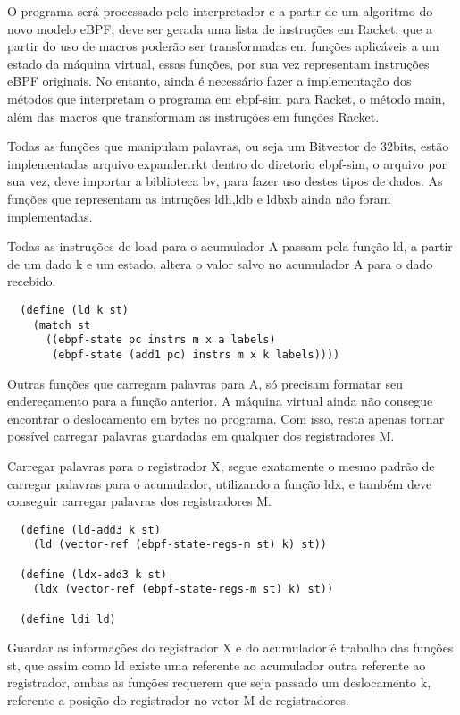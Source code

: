 \documentclass[paper=a4, fontsize=12pt]{article}
\theoremstyle{definition}
\begin{document}
O programa será processado pelo interpretador e a partir de um algoritmo do novo
modelo eBPF, deve ser gerada uma lista de instruções em Racket, que a partir do uso de macros
poderão ser transformadas em funções aplicáveis a um estado da máquina virtual, essas funções,
por sua vez representam instruções eBPF originais. No entanto, ainda é necessário fazer a implementação
dos métodos  que interpretam o programa em ebpf-sim para Racket, o método main, além das macros
que transformam as instruções em funções Racket. 

Todas as funções que manipulam palavras, ou seja um Bitvector de 32bits, estão implementadas
arquivo expander.rkt dentro do diretorio ebpf-sim, o arquivo por sua vez, deve importar a biblioteca 
bv, para fazer uso destes tipos de dados. As funções que representam as intruções ldh,ldb e ldbxb
ainda não foram implementadas.

Todas as instruções de load para o acumulador A passam pela função ld, a partir de um dado k e um
estado, altera o valor salvo no acumulador A para o dado recebido.

\begin{lstlisting}
  (define (ld k st)
    (match st
      ((ebpf-state pc instrs m x a labels)
       (ebpf-state (add1 pc) instrs m x k labels))))
\end{lstlisting}

Outras funções que carregam palavras para A, só precisam formatar seu endereçamento para a função
anterior. A máquina virtual ainda não consegue encontrar o deslocamento em bytes no programa.
Com isso, resta apenas tornar possível carregar palavras guardadas em qualquer dos registradores M.

Carregar palavras para o registrador X, segue exatamente o mesmo padrão de carregar palavras para
o acumulador, utilizando a função ldx, e também deve conseguir carregar palavras dos registradores M.

\begin{lstlisting}
  (define (ld-add3 k st)
    (ld (vector-ref (ebpf-state-regs-m st) k) st))

  (define (ldx-add3 k st)
    (ldx (vector-ref (ebpf-state-regs-m st) k) st))

  (define ldi ld)
\end{lstlisting}

Guardar as informações do registrador X e do acumulador é trabalho das funções st, que assim como ld
existe uma referente ao acumulador outra referente ao registrador, ambas as funções requerem que seja
passado um deslocamento k, referente a posição do registrador no vetor M de registradores.
\end{document}
